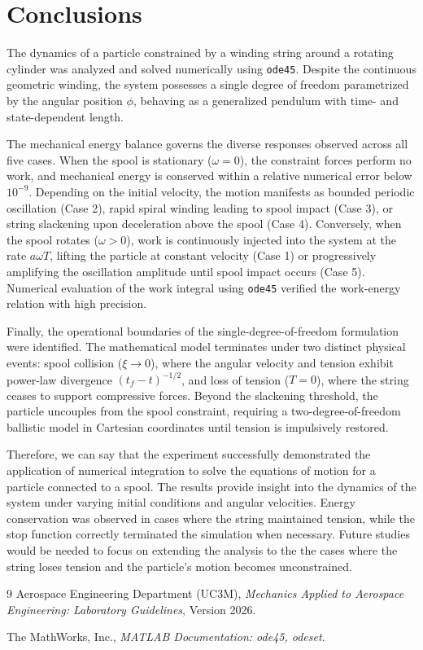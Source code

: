 \documentclass[11pt,a4paper]{article}
\begin{document}
\section{Conclusions}
The dynamics of a particle constrained by a winding string around a rotating cylinder was analyzed and solved numerically using \texttt{ode45}. Despite the continuous geometric winding, the system possesses a single degree of freedom parametrized by the angular position $\phi$, behaving as a generalized pendulum with time- and state-dependent length.

The mechanical energy balance governs the diverse responses observed across all five cases. When the spool is stationary ($\omega = 0$), the constraint forces perform no work, and mechanical energy is conserved within a relative numerical error below $10^{-9}$. Depending on the initial velocity, the motion manifests as bounded periodic oscillation (Case 2), rapid spiral winding leading to spool impact (Case 3), or string slackening upon deceleration above the spool (Case 4). Conversely, when the spool rotates ($\omega > 0$), work is continuously injected into the system at the rate $a\omega T$, lifting the particle at constant velocity (Case 1) or progressively amplifying the oscillation amplitude until spool impact occurs (Case 5). Numerical evaluation of the work integral using \texttt{ode45} verified the work-energy relation with high precision.

Finally, the operational boundaries of the single-degree-of-freedom formulation were identified. The mathematical model terminates under two distinct physical events: spool collision ($\xi \to 0$), where the angular velocity and tension exhibit power-law divergence $(t_f - t)^{-1/2}$, and loss of tension ($T = 0$), where the string ceases to support compressive forces. Beyond the slackening threshold, the particle uncouples from the spool constraint, requiring a two-degree-of-freedom ballistic model in Cartesian coordinates until tension is impulsively restored.


Therefore, we can say that the experiment successfully demonstrated the application of numerical integration to solve the equations of motion for a particle connected to a spool. The results provide insight into the dynamics of the system under varying initial conditions and angular velocities. Energy conservation was observed in cases where the string maintained tension, while the stop function correctly terminated the simulation when necessary. Future studies would be needed to focus on extending the analysis to the the cases where the string loses tension and the particle’s motion becomes unconstrained.

\begin{thebibliography}{9}
  Aerospace Engineering Department (UC3M),
  \emph{Mechanics Applied to Aerospace Engineering: Laboratory Guidelines}, Version 2026.

  The MathWorks, Inc.,
  \emph{MATLAB Documentation: ode45, odeset}.
\end{thebibliography}
\end{document}
